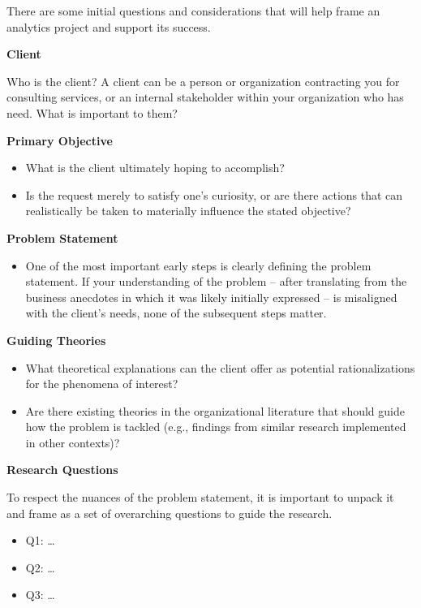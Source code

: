 \documentclass[
]{book}
\providecommand{\tightlist}{%
  \setlength{\itemsep}{0pt}\setlength{\parskip}{0pt}}
\begin{document}
There are some initial questions and considerations that will help frame an analytics project and support its success.

\textbf{Client}

Who is the client? A client can be a person or organization contracting you for consulting services, or an internal stakeholder within your organization who has need. What is important to them?

\textbf{Primary Objective}

\begin{itemize}
\tightlist
\item
  What is the client ultimately hoping to accomplish?
\item
  Is the request merely to satisfy one's curiosity, or are there actions that can realistically be taken to materially influence the stated objective?
\end{itemize}

\textbf{Problem Statement}

\begin{itemize}
\tightlist
\item
  One of the most important early steps is clearly defining the problem statement. If your understanding of the problem -- after translating from the business anecdotes in which it was likely initially expressed -- is misaligned with the client's needs, none of the subsequent steps matter.
\end{itemize}

\textbf{Guiding Theories}

\begin{itemize}
\tightlist
\item
  What theoretical explanations can the client offer as potential rationalizations for the phenomena of interest?
\item
  Are there existing theories in the organizational literature that should guide how the problem is tackled (e.g., findings from similar research implemented in other contexts)?
\end{itemize}

\textbf{Research Questions}

To respect the nuances of the problem statement, it is important to unpack it and frame as a set of overarching questions to guide the research.

\begin{itemize}
\tightlist
\item
  Q1: \ldots{}
\item
  Q2: \ldots{}
\item
  Q3: \ldots{}
\end{itemize}
\end{document}
